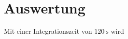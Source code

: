 \section{Auswertung}
\label{sec:Auswertung}

Mit einer Integrationszeit von $\qty{120}{\second}$ wird
